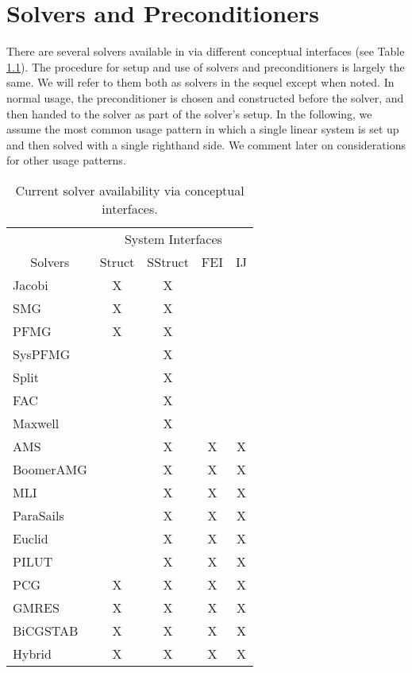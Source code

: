 
\chapter{Solvers and Preconditioners}
\label{ch-Solvers}

There are several solvers available in \hypre{} via different
conceptual interfaces (see Table \ref{table-solver-availability}).
The procedure for setup and use of solvers and preconditioners is
largely the same. We will refer to them both as solvers in the sequel
except when noted.  In normal usage, the preconditioner is chosen and
constructed before the solver, and then handed to the solver as part
of the solver's setup.  In the following, we assume the most common
usage pattern in which a single linear system is set up and then
solved with a single righthand side. We comment later on
considerations for other usage patterns.

\begin{table}[h]
\center
\begin{tabular}{|l||c|c|c|c|}
\hline
                               & \multicolumn{4}{|c|}{System Interfaces} \\
\multicolumn{1}{|c||}{Solvers} & Struct & SStruct & FEI & IJ \\
\hline\hline
Jacobi     & X & X &   &   \\
SMG        & X & X &   &   \\
PFMG       & X & X &   &   \\
SysPFMG    &   & X &   &   \\
Split      &   & X &   &   \\
FAC        &   & X &   &   \\
Maxwell    &   & X &   &   \\
AMS        &   & X & X & X \\
BoomerAMG  &   & X & X & X \\
MLI        &   & X & X & X \\
ParaSails  &   & X & X & X \\
Euclid     &   & X & X & X \\
PILUT      &   & X & X & X \\
PCG        & X & X & X & X \\
GMRES      & X & X & X & X \\
BiCGSTAB   & X & X & X & X \\
Hybrid     & X & X & X & X \\
\hline
\end{tabular}
\caption{%
Current solver availability via \hypre{} conceptual interfaces.
}
\label{table-solver-availability}
\end{table}

